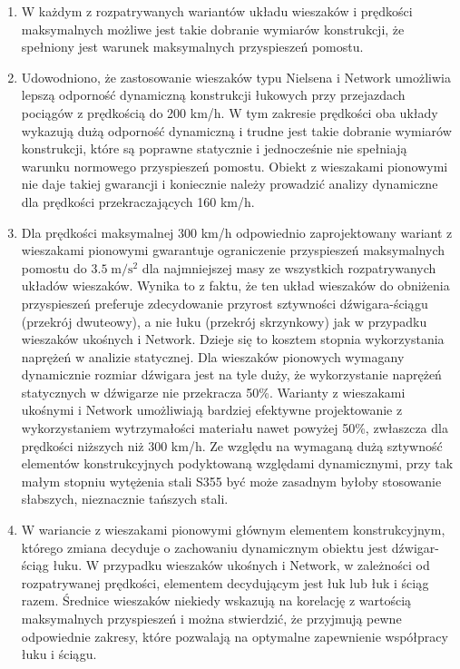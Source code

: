\begin{enumerate}
	
\item W każdym z rozpatrywanych wariantów układu wieszaków i prędkości maksymalnych możliwe jest takie dobranie wymiarów konstrukcji, że spełniony jest warunek maksymalnych przyspieszeń pomostu.
	
\item Udowodniono, że zastosowanie wieszaków typu Nielsena i Network umożliwia lepszą odporność dynamiczną konstrukcji łukowych przy przejazdach pociągów z prędkością do 200 km/h. W tym zakresie prędkości oba układy wykazują dużą odporność dynamiczną i trudne jest takie dobranie wymiarów konstrukcji, które są poprawne statycznie i jednocześnie nie spełniają warunku normowego przyspieszeń pomostu. Obiekt z wieszakami pionowymi nie daje takiej gwarancji i koniecznie należy prowadzić analizy dynamiczne dla prędkości przekraczających 160 km/h. 

\item Dla prędkości maksymalnej 300 km/h odpowiednio zaprojektowany wariant z wieszakami pionowymi gwarantuje ograniczenie przyspieszeń maksymalnych pomostu do $3.5\;\mathrm{m/s^2}$ dla najmniejszej masy ze wszystkich rozpatrywanych układów wieszaków. Wynika to z faktu, że ten układ wieszaków do obniżenia przyspieszeń preferuje zdecydowanie przyrost sztywności dźwigara-ściągu (przekrój dwuteowy), a nie łuku (przekrój skrzynkowy) jak w przypadku wieszaków ukośnych i Network. Dzieje się to kosztem stopnia wykorzystania naprężeń w analizie statycznej. Dla wieszaków pionowych wymagany dynamicznie rozmiar dźwigara jest na tyle duży, że wykorzystanie naprężeń statycznych w dźwigarze nie przekracza 50\%. Warianty z wieszakami ukośnymi i Network umożliwiają bardziej efektywne projektowanie z wykorzystaniem wytrzymałości materiału nawet powyżej 50\%, zwłaszcza dla prędkości niższych niż 300 km/h. Ze względu na wymaganą dużą sztywność elementów konstrukcyjnych podyktowaną względami dynamicznymi, przy tak małym stopniu wytężenia stali S355 być może zasadnym byłoby stosowanie słabszych, nieznacznie tańszych stali.

\item W wariancie z wieszakami pionowymi głównym elementem konstrukcyjnym, którego zmiana decyduje o zachowaniu dynamicznym obiektu jest dźwigar-ściąg łuku. W przypadku wieszaków ukośnych i Network, w zależności od rozpatrywanej prędkości, elementem decydującym jest łuk lub łuk i ściąg razem. Średnice wieszaków niekiedy wskazują na korelację z wartością maksymalnych przyspieszeń i można stwierdzić, że przyjmują pewne odpowiednie zakresy, które pozwalają na optymalne zapewnienie współpracy łuku i ściągu.


\end{enumerate}
